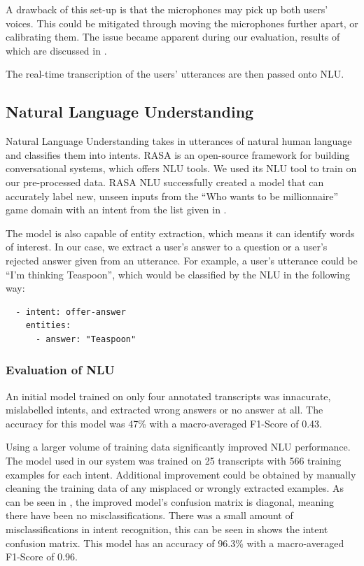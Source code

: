 \documentclass[hidelinks, 11pt]{article}
\begin{document}
A drawback of this set-up is that the microphones may pick up both users' voices. This could be mitigated through moving the microphones further apart, or calibrating them. The issue became apparent during our evaluation, results of which are discussed in .

The real-time transcription of the users' utterances are then passed onto NLU.

\subsection{Natural Language Understanding}
\label{subsec:nlu}

Natural Language Understanding takes in utterances of natural human language and classifies them into intents. RASA is an open-source framework for building conversational systems, which offers NLU tools. We used its NLU tool to train on our pre-processed data. RASA NLU successfully created a model that can accurately label new, unseen inputs from the ``Who wants to be millionnaire'' game domain with an intent from the list given in .

The model is also capable of entity extraction, which means it can identify words of interest. In our case, we extract a user's answer to a question or a user's rejected answer given from an utterance. For example, a user's utterance could be ``I'm thinking Teaspoon'', which would be classified by the NLU in the following way:

\begin{verbatim}
  - intent: offer-answer
    entities:
      - answer: "Teaspoon"
\end{verbatim}

\subsubsection{Evaluation of NLU}
\label{subsec:NLU_evaluation}

An initial model trained on only four annotated transcripts was innacurate, mislabelled intents, and extracted wrong answers or no answer at all. The accuracy for this model was 47\% with a macro-averaged F1-Score of 0.43.

Using a larger volume of training data significantly improved NLU performance. The model used in our system was trained on 25 transcripts with 566 training examples for each intent. Additional improvement could be obtained by manually cleaning the training data of any misplaced or wrongly extracted examples. As can be seen in , the improved model's confusion matrix is diagonal, meaning there have been no misclassifications. There was a small amount of misclassifications in intent recognition, this can be seen in  shows the intent confusion matrix. This model has an accuracy of 96.3\% with a macro-averaged F1-Score of 0.96.
\end{document}
